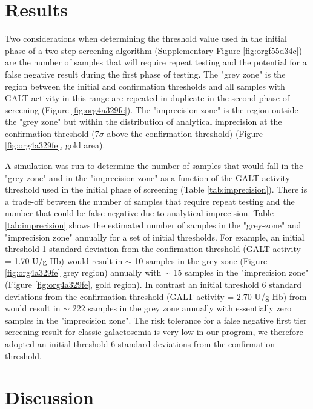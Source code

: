 \documentclass[review]{elsarticle}
\begin{document}
\section*{Results}
\label{sec:orge591442}

Two considerations when determining the threshold value used in the
initial phase of a two step screening algorithm (Supplementary Figure
\ref{fig:orgf55d34c}) are the number of samples that will require repeat
testing and the potential for a false negative result during the first
phase of testing.  The "grey zone" is the region between the initial
and confirmation thresholds and all samples with GALT activity in this
range are repeated in duplicate in the second phase of screening
(Figure \ref{fig:org4a329fe}). The "imprecision zone" is the region outside
the "grey zone" but within the distribution of analytical imprecision
at the confirmation threshold (7\(\sigma\) above the confirmation
threshold) (Figure \ref{fig:org4a329fe}, gold area). 

A simulation was run to determine the number of samples that would
fall in the "grey zone" and in the "imprecision zone" as a function of
the GALT activity threshold used in the initial phase of screening
(Table \ref{tab:imprecision}). There is a trade-off between the number
of samples that require repeat testing and the number that could be
false negative due to analytical imprecision. Table
\ref{tab:imprecision} shows the estimated number of samples in the
"grey-zone" and "imprecision zone" annually for a set of initial
thresholds. For example, an initial threshold 1 standard deviation
from the confirmation threshold (GALT activity = 1.70 U/g Hb) would
result in \(\sim\) 10 samples in the grey zone (Figure \ref{fig:org4a329fe}
grey region) annually with \(\sim\) 15 samples in the "imprecision zone"
(Figure \ref{fig:org4a329fe}, gold region). In contrast an initial
threshold 6 standard deviations from the confirmation threshold (GALT
activity = 2.70 U/g Hb) from would result in \(\sim\) 222 samples in the
grey zone annually with essentially zero samples in the "imprecision
zone". The risk tolerance for a false negative first tier screening
result for classic galactosemia is very low in our program, we
therefore adopted an initial threshold 6 standard deviations from the
confirmation threshold.

\section*{Discussion}
\label{sec:org3c38a52}
\end{document}
